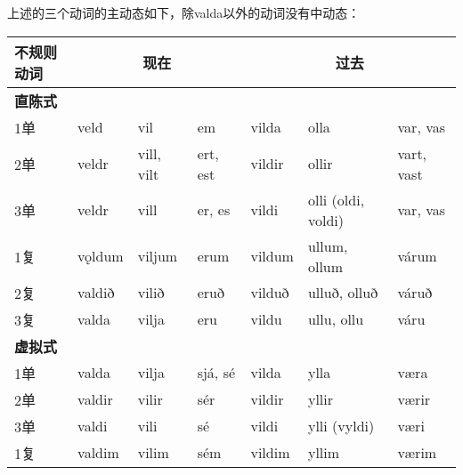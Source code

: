 上述的三个动词的主动态如下，除valda以外的动词没有中动态：

\begin{longtable}{llll|lll}
    \toprule
    不规则动词        & \multicolumn{3}{c}{现在} & \multicolumn{3}{c}{过去}                                                                    \\
    \midrule
    \endhead
    \bottomrule
    \endfoot
    \textbf{直陈式}   &                          &                          & \multicolumn{1}{r}{ } &        &                    &            \\
    1单               & veld                     & vil                      & em                    & vilda  & olla               & var, vas   \\
    2单               & veldr                    & vill, vilt               & ert, est              & vildir & ollir              & vart, vast \\
    3单               & veldr                    & vill                     & er, es                & vildi  & olli (oldi, voldi) & var, vas   \\
    1复               & vǫldum                   & viljum                   & erum                  & vildum & ullum, ollum       & várum      \\
    2复               & valdið                   & vilið                    & eruð                  & vilduð & ulluð, olluð       & váruð      \\
    3复               & valda                    & vilja                    & eru                   & vildu  & ullu, ollu         & váru       \\
    \textbf{虚拟式}   &                          &                          & \multicolumn{1}{r}{ } &        &                    &            \\
    1单               & valda                    & vilja                    & sjá, sé               & vilda  & ylla               & væra       \\
    2单               & valdir                   & vilir                    & sér                   & vildir & yllir              & værir      \\
    3单               & valdi                    & vili                     & sé                    & vildi  & ylli (vyldi)       & væri       \\
    1复               & valdim                   & vilim                    & sém                   & vildim & yllim              & værim      \\

\end{longtable}
